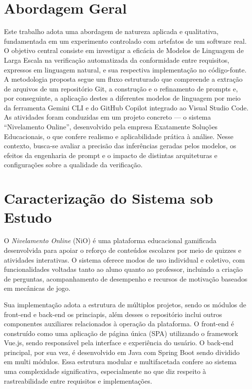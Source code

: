 
\section{Abordagem Geral}
Este trabalho adota uma abordagem de natureza aplicada e qualitativa, fundamentada em um experimento controlado com artefatos de um software real. O objetivo central consiste em investigar a eficácia de Modelos de Linguagem de Larga Escala  na verificação automatizada da conformidade entre requisitos, expressos em linguagem natural, e sua respectiva implementação no código-fonte. A metodologia proposta segue um fluxo estruturado que compreende a extração de arquivos de um repositório Git, a construção e o refinamento de prompts e, por conseguinte, a aplicação destes a diferentes modelos de linguagem por meio da ferramenta Gemini CLI e do GitHub Copilot integrado ao Visual Studio Code. As atividades foram conduzidas em um projeto concreto — o sistema “Nivelamento Online”, desenvolvido pela empresa Exatamente Soluções Educacionais, o que confere realismo e aplicabilidade prática à análise. Nesse contexto, busca-se avaliar a precisão das inferências geradas pelos modelos, os efeitos da engenharia de prompt e o impacto de distintas arquiteturas e configurações sobre a qualidade da verificação.

\section{Caracterização do Sistema sob Estudo}

O \textit{Nivelamento Online} (NiO) é uma plataforma educacional gamificada desenvolvida para apoiar o reforço de conteúdos escolares por meio de quizzes e atividades interativas. O sistema oferece modos de uso individual e coletivo, com funcionalidades voltadas tanto ao aluno quanto ao professor, incluindo a criação de perguntas, acompanhamento de desempenho e recursos de motivação baseados em mecânicas de jogo. 

Sua implementação adota a estrutura de múltiplos projetos, sendo os módulos de front-end e back-end os princiapis, além desses o repositório inclui outros componentes auxiliares relacionados à operação da plataforma. O front-end é construído como uma aplicação de página única (SPA) utilizando o framework Vue.js, sendo responsável pela interface e experiência do usuário. O back-end principal, por sua vez, é desenvolvido em Java com Spring Boot sendo dividido em multi módulos. Essa estrutura modular e multifacetada confere ao sistema uma complexidade significativa, especialmente no que diz respeito à rastreabilidade entre requisitos e implementações.

